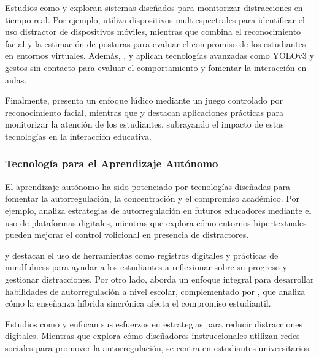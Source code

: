 \documentclass[a4paper,fleqn]{cas-sc}
\begin{document}
	Estudios como \cite{Campbell2015Using} y \cite{Ucar2022Recognizing} exploran sistemas diseñados para monitorizar distracciones en tiempo real. Por ejemplo, \cite{Campbell2015Using} utiliza dispositivos multiespectrales para identificar el uso distractor de dispositivos móviles, mientras que \cite{Ucar2022Recognizing} combina el reconocimiento facial y la estimación de posturas para evaluar el compromiso de los estudiantes en entornos virtuales. Además, \cite{Argel2023Intellitell}, \cite{Erazo2016Easing} y \cite{Nguyen2019} aplican tecnologías avanzadas como YOLOv3 y gestos sin contacto para evaluar el comportamiento y fomentar la interacción en aulas.
	
	Finalmente, \cite{Muller2018ArchnSmile} presenta un enfoque lúdico mediante un juego controlado por reconocimiento facial, mientras que \cite{Narkhede2023} y \cite{Kulkarni2023} destacan aplicaciones prácticas para monitorizar la atención de los estudiantes, subrayando el impacto de estas tecnologías en la interacción educativa.
	
	\subsubsection{Tecnología para el Aprendizaje Autónomo}
	
	El aprendizaje autónomo ha sido potenciado por tecnologías diseñadas para fomentar la autorregulación, la concentración y el compromiso académico. Por ejemplo, \cite{Bembich2016Future} analiza estrategias de autorregulación en futuros educadores mediante el uso de plataformas digitales, mientras que \cite{Peters2003Self} explora cómo entornos hipertextuales pueden mejorar el control volicional en presencia de distractores.
	
	\cite{Roberts2020Task} y \cite{Adcroft2018Developing} destacan el uso de herramientas como registros digitales y prácticas de mindfulness para ayudar a los estudiantes a reflexionar sobre su progreso y gestionar distracciones. Por otro lado, \cite{Salter2014Exploring} aborda un enfoque integral para desarrollar habilidades de autorregulación a nivel escolar, complementado por \cite{Palmer2022impact}, que analiza cómo la enseñanza híbrida sincrónica afecta el compromiso estudiantil.
	
	Estudios como \cite{Muljana2022Instructional} y \cite{Wang2022Empowering} enfocan sus esfuerzos en estrategias para reducir distracciones digitales. Mientras que \cite{Muljana2022Instructional} explora cómo diseñadores instruccionales utilizan redes sociales para promover la autorregulación, \cite{Wang2022Empowering} se centra en estudiantes universitarios.
	
\end{document}
